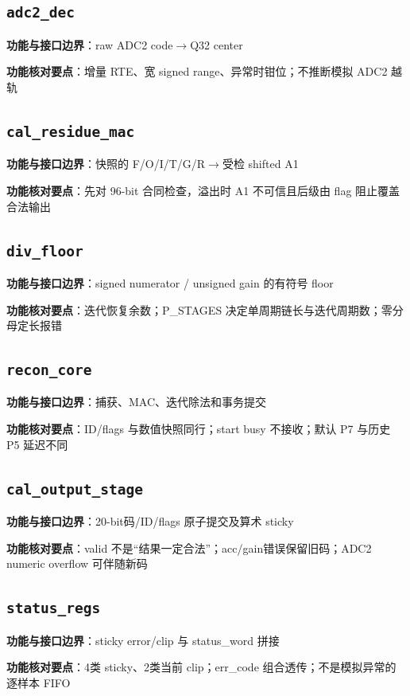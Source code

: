 \documentclass[UTF8,fontset=fandol,10pt,a4paper,openany]{ctexrep}
\newcommand{\code}[1]{\nolinkurl{#1}}
\begin{document}
\subsection*{\code{adc2_dec}}
\noindent\textbf{功能与接口边界}：raw ADC2 code\ensuremath{\rightarrow}Q32 center\par
\noindent\textbf{功能核对要点}：增量 RTE、宽 signed range、异常时钳位；不推断模拟 ADC2 越轨\par
\subsection*{\code{cal_residue_mac}}
\noindent\textbf{功能与接口边界}：快照的 F/O/I/T/G/R\ensuremath{\rightarrow}受检 shifted A1\par
\noindent\textbf{功能核对要点}：先对 96-bit 合同检查，溢出时 A1 不可信且后级由 flag 阻止覆盖合法输出\par
\subsection*{\code{div_floor}}
\noindent\textbf{功能与接口边界}：signed numerator / unsigned gain 的有符号 floor\par
\noindent\textbf{功能核对要点}：迭代恢复余数；P\_STAGES 决定单周期链长与迭代周期数；零分母定长报错\par
\subsection*{\code{recon_core}}
\noindent\textbf{功能与接口边界}：捕获、MAC、迭代除法和事务提交\par
\noindent\textbf{功能核对要点}：ID/flags 与数值快照同行；start busy 不接收；默认 P7 与历史 P5 延迟不同\par
\subsection*{\code{cal_output_stage}}
\noindent\textbf{功能与接口边界}：20-bit码/ID/flags 原子提交及算术 sticky\par
\noindent\textbf{功能核对要点}：valid 不是“结果一定合法”；acc/gain错误保留旧码；ADC2 numeric overflow 可伴随新码\par
\subsection*{\code{status_regs}}
\noindent\textbf{功能与接口边界}：sticky error/clip 与 status\_word 拼接\par
\noindent\textbf{功能核对要点}：4类 sticky、2类当前 clip；err\_code 组合透传；不是模拟异常的逐样本 FIFO\par
\end{document}
